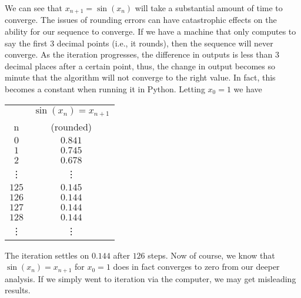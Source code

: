 \documentclass[11pt]{article}
\theoremstyle{definition}
\newcommand{\1}[1]{\mathbf{1} \left \{ #1 \right \}}
\begin{document}
We can see that $x_{n+1} = \sin (x_n)$ will take a substantial amount of time to converge.  The issues of rounding errors can have catastrophic effects on the ability for our sequence to converge.  If we have a machine that only computes to say the first $3$ decimal points (i.e., it rounds), then the sequence will never converge.  As the iteration progresses, the difference in outputs is less than $3$ decimal places after a certain point, thus, the change in output becomes so minute that the algorithm will not converge to the right value.  In fact, this becomes a constant when running it in Python.  Letting $x_0 = 1$ we have
\begin{center}
\begin{tabular}{ |c|c| }
\hline
 & \(\sin(x_n) = x_{n+1}\) \\
n  & (rounded) \\
\hline
$0$ & $0.841$ \\
$1$ & $0.745$ \\
$2$ & $0.678$ \\
\vdots & \vdots \\
$125$ & $0.145$ \\
$126$ & $0.144$ \\
$127$ & $0.144$ \\
$128$ & $0.144$ \\
\vdots & \vdots \\
\hline
\end{tabular}
\end{center}
The iteration settles on $0.144$ after $126$ steps.  Now of course, we know that $\sin (x_n) = x_{n+1}$ for $x_0 = 1$ does in fact converges to zero from our deeper analysis.  If we simply went to iteration via the computer, we may get misleading results.
\end{document}
